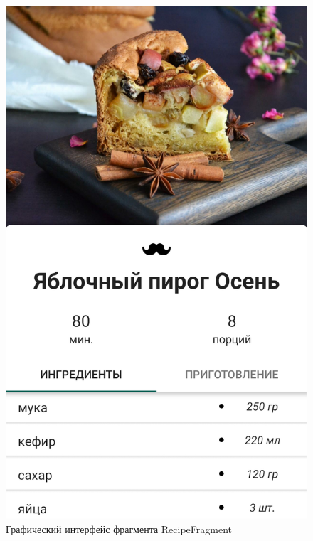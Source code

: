 \documentclass[14pt]{matmex-diploma-custom}
\begin{document}
\begin{figure}[h]
\centering
\includegraphics[scale=0.15]{recipepage.png}
\caption{Графический интерфейс фрагмента RecipeFragment}
\label{recipepage}
\end{figure}
\end{document}
